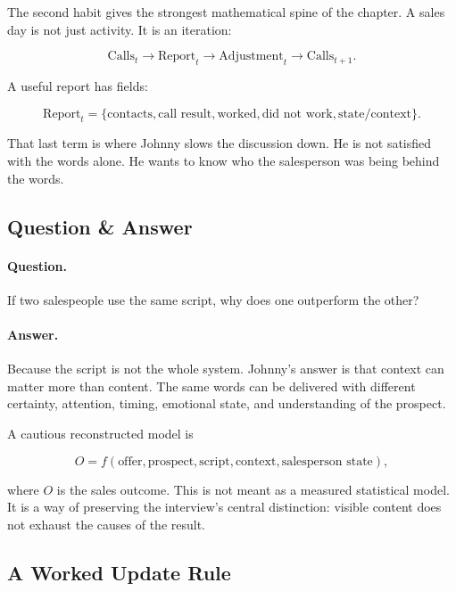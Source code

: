 The second habit gives the strongest mathematical spine of the chapter. A sales day is not just activity. It is an iteration:

\begin{equation}
\text{Calls}_t
\longrightarrow
\text{Report}_t
\longrightarrow
\text{Adjustment}_t
\longrightarrow
\text{Calls}_{t+1}.
\end{equation}

A useful report has fields:

\begin{equation}
\text{Report}_t =
\{
\text{contacts},
\text{call result},
\text{worked},
\text{did not work},
\text{state/context}
\}.
\end{equation}

That last term is where Johnny slows the discussion down. He is not satisfied with the words alone. He wants to know who the salesperson was being behind the words.

\subsection{Question \& Answer}

\paragraph{Question.}
If two salespeople use the same script, why does one outperform the other?

\paragraph{Answer.}
Because the script is not the whole system. Johnny's answer is that context can matter more than content. The same words can be delivered with different certainty, attention, timing, emotional state, and understanding of the prospect.

A cautious reconstructed model is

\begin{equation}
O =
f(
\text{offer},
\text{prospect},
\text{script},
\text{context},
\text{salesperson state}
),
\end{equation}

where \(O\) is the sales outcome. This is not meant as a measured statistical model. It is a way of preserving the interview's central distinction: visible content does not exhaust the causes of the result.

\subsection{A Worked Update Rule}

